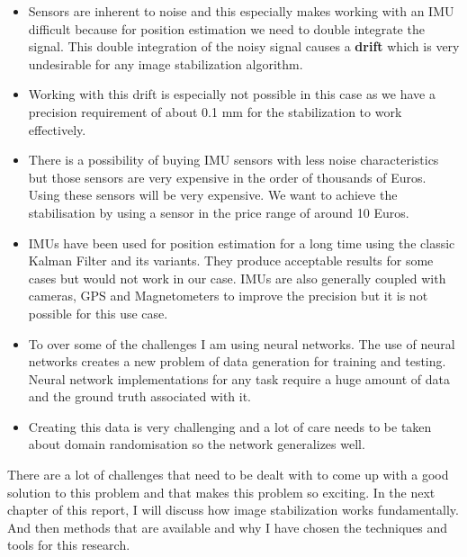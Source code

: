 \begin{itemize}
\item Sensors are inherent to noise and this especially makes working with an IMU difficult because for position estimation we need to double integrate the signal. This double integration of the noisy signal causes a \textbf{drift} which is very undesirable for any image stabilization algorithm. 
\item Working with this drift is especially not possible in this case as we have a precision requirement of about 0.1 mm for the stabilization to work effectively.
\item There is a possibility of buying IMU sensors with less noise characteristics but those sensors are very expensive in the order of thousands of Euros. Using these sensors will be very expensive. We want to achieve the stabilisation by using a sensor in the price range of around 10 Euros. 
\item IMUs have been used for position estimation for a long time using the classic Kalman Filter and its variants. They produce acceptable results for some cases but would not work in our case. IMUs are also generally coupled with cameras, GPS and Magnetometers to improve the precision but it is not possible for this use case.
\item  To over some of the challenges I am using neural networks. The use of neural networks creates a new problem of data generation for training and testing. Neural network implementations for any task require a huge amount of data and the ground truth associated with it.
\item Creating this data is very challenging and a lot of care needs to be taken about domain randomisation so the network generalizes well.
\end{itemize}
There are a lot of challenges that need to be dealt with to come up with a good solution to this problem and that makes this problem so exciting. In the next chapter of this report, I will discuss how image stabilization works fundamentally. And then methods that are available and why I have chosen the techniques and tools for this research.

